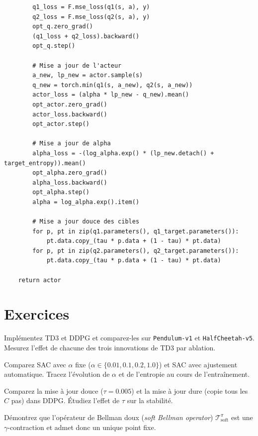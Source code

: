 \begin{codeblock}[title=\textbf{SAC --- Entra\^inement}]
\begin{verbatim}
        q1_loss = F.mse_loss(q1(s, a), y)
        q2_loss = F.mse_loss(q2(s, a), y)
        opt_q.zero_grad()
        (q1_loss + q2_loss).backward()
        opt_q.step()

        # Mise a jour de l'acteur
        a_new, lp_new = actor.sample(s)
        q_new = torch.min(q1(s, a_new), q2(s, a_new))
        actor_loss = (alpha * lp_new - q_new).mean()
        opt_actor.zero_grad()
        actor_loss.backward()
        opt_actor.step()

        # Mise a jour de alpha
        alpha_loss = -(log_alpha.exp() * (lp_new.detach() + target_entropy)).mean()
        opt_alpha.zero_grad()
        alpha_loss.backward()
        opt_alpha.step()
        alpha = log_alpha.exp().item()

        # Mise a jour douce des cibles
        for p, pt in zip(q1.parameters(), q1_target.parameters()):
            pt.data.copy_(tau * p.data + (1 - tau) * pt.data)
        for p, pt in zip(q2.parameters(), q2_target.parameters()):
            pt.data.copy_(tau * p.data + (1 - tau) * pt.data)

    return actor
\end{verbatim}
\end{codeblock}

\section{Exercices}

\begin{exercice}[TD3 vs DDPG]
Impl\'ementez TD3 et DDPG et comparez-les sur \texttt{Pendulum-v1} et
\texttt{HalfCheetah-v5}. Mesurez l'effet de chacune des trois innovations
de TD3 par ablation.
\end{exercice}

\begin{exercice}
Comparez SAC avec $\alpha$ fixe ($\alpha \in \{0.01, 0.1, 0.2, 1.0\}$)
et SAC avec ajustement automatique. Tracez l'\'evolution de $\alpha$ et
de l'entropie au cours de l'entra\^inement.
\end{exercice}

\begin{exercice}
Comparez la mise \`a jour douce ($\tau = 0.005$) et la mise \`a jour dure
(copie tous les $C$ pas) dans DDPG. \'Etudiez l'effet de $\tau$ sur la stabilit\'e.
\end{exercice}

\begin{exercice}
D\'emontrez que l'op\'erateur de Bellman doux (\emph{soft Bellman operator})
$\mathcal{T}^\pi_{\text{soft}}$ est une $\gamma$-contraction et admet donc
un unique point fixe.
\end{exercice}
